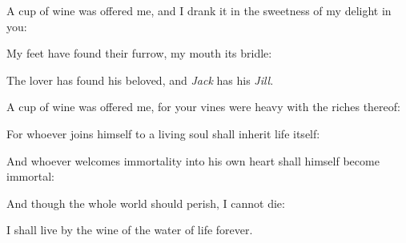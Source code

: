 \begin{justify}
\par A cup of wine was offered me, and I drank it in the sweetness of my delight in you:
\par My feet have found their furrow, my mouth its bridle:
\par The lover has found his beloved, and \textit{Jack} has his \textit{Jill}.
\par A cup of wine was offered me, for your vines were heavy with the riches thereof:
\par For whoever joins himself to a living soul shall inherit life itself:
\par And whoever welcomes immortality into his own heart shall himself become immortal:
\par And though the whole world should perish, I cannot die:
\par I shall live by the wine of the water of life forever.
\end{justify}
